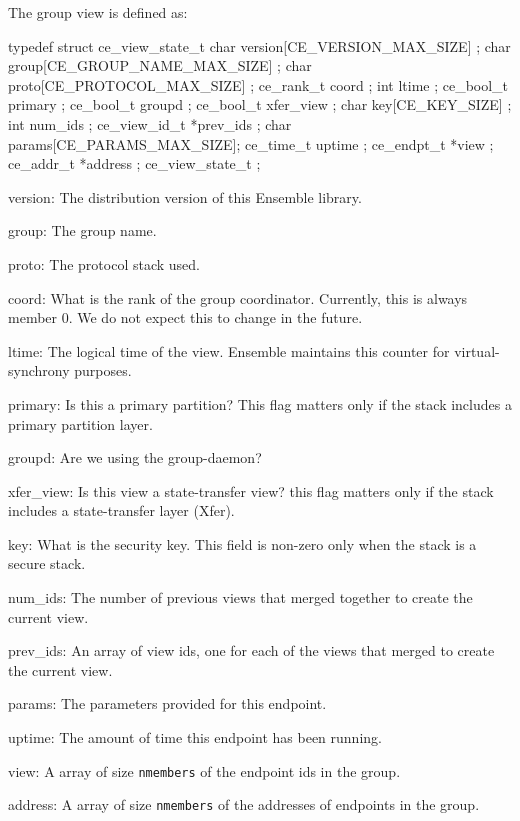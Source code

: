The group view is defined as: 
\begin{codebox}
typedef struct ce_view_state_t {
    char version[CE_VERSION_MAX_SIZE] ;     
    char group[CE_GROUP_NAME_MAX_SIZE] ;    
    char proto[CE_PROTOCOL_MAX_SIZE] ;      
    ce_rank_t coord ;              
    int ltime ;                    
    ce_bool_t primary ;            
    ce_bool_t groupd ;             
    ce_bool_t xfer_view ;          
    char key[CE_KEY_SIZE] ;        
    int num_ids ;                  
    ce_view_id_t *prev_ids ;       
    char params[CE_PARAMS_MAX_SIZE];
    ce_time_t uptime ;             
    ce_endpt_t *view ;             
    ce_addr_t  *address ;          
} ce_view_state_t ;
\end{codebox}

\begin{description}
\item{version:} The distribution version of this Ensemble library.
\item{group:} The group name. 
\item{proto:} The protocol stack used.
\item{coord:} What is the rank of the group coordinator. Currently,
  this is always member 0. We do not expect this to change in the
  future.               
\item{ltime:} The logical time of the view. Ensemble maintains this
  counter for virtual-synchrony purposes.                      
\item{primary:} Is this a primary partition? This flag matters only if
  the stack includes a primary partition layer.             
\item{groupd:} Are we using the group-daemon? 
\item{xfer\_view:} Is this view a state-transfer view? this flag
  matters only if the stack includes a state-transfer layer (Xfer). 
\item{key:}  What is the security key. This field is non-zero only
  when the stack is a secure stack. 
\item{num\_ids:} The number of previous views that merged together to
  create the current view. 
\item{prev\_ids:} An array of view ids, one for each of the views that
  merged to create the current view. 
\item{params:} The parameters provided for this endpoint. 
\item{uptime:} The amount of time this endpoint has been running.              
\item{view:} A array of size {\tt nmembers} of the endpoint ids in the group.
\item{address:} A array of size {\tt nmembers} of the addresses of
  endpoints in the group.
\end{description}

